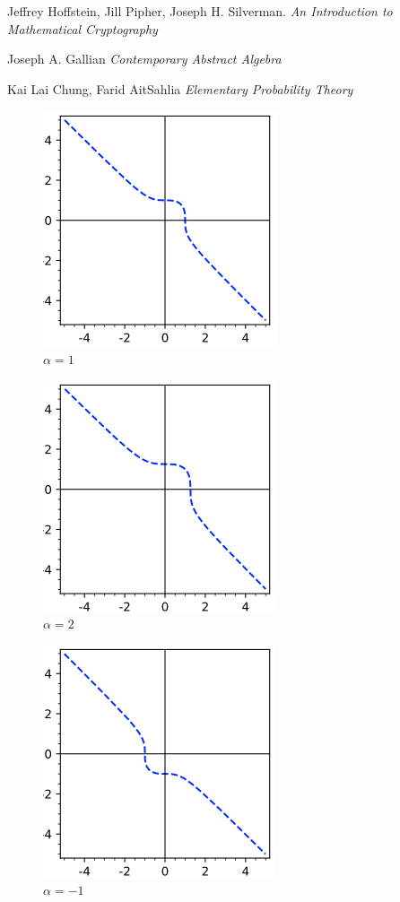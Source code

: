 \documentclass[12pt,letterpaper]{article}
\begin{document}
\begin{thebibliography}{9}
 
Jeffrey Hoffstein, Jill Pipher, Joseph H. Silverman.
\textit{An Introduction to Mathematical Cryptography}
 
Joseph A. Gallian
\textit{Contemporary Abstract Algebra}

Kai Lai Chung, Farid AitSahlia
\textit{Elementary Probability Theory}

\end{thebibliography}
\newpage
\begin{figure}
    \centering
    \includegraphics{Midterm2/1.png}
    \caption{$\alpha = 1$}
    \label{fig:my_label}
\end{figure}

\begin{figure}
    \centering
    \includegraphics{Midterm2/2.png}
    \caption{$\alpha = 2$}
    \label{fig:my_label}
\end{figure}

\begin{figure}
    \centering
    \includegraphics{Midterm2/-1.png}
    \caption{$\alpha = -1$}
    \label{fig:my_label}
\end{figure}
    
\end{document}
